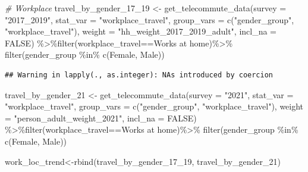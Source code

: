 \documentclass[
  12pt,
]{article}
\newenvironment{Shaded}{\begin{snugshade}}{\end{snugshade}}
\newcommand{\AttributeTok}[1]{\textcolor[rgb]{0.77,0.63,0.00}{#1}}
\newcommand{\CommentTok}[1]{\textcolor[rgb]{0.56,0.35,0.01}{\textit{#1}}}
\newcommand{\ConstantTok}[1]{\textcolor[rgb]{0.00,0.00,0.00}{#1}}
\newcommand{\FunctionTok}[1]{\textcolor[rgb]{0.00,0.00,0.00}{#1}}
\newcommand{\NormalTok}[1]{#1}
\newcommand{\OtherTok}[1]{\textcolor[rgb]{0.56,0.35,0.01}{#1}}
\newcommand{\SpecialCharTok}[1]{\textcolor[rgb]{0.00,0.00,0.00}{#1}}
\newcommand{\StringTok}[1]{\textcolor[rgb]{0.31,0.60,0.02}{#1}}
\begin{document}
\begin{Shaded}
\begin{Highlighting}[]
\CommentTok{\# Workplace}
\NormalTok{travel\_by\_gender\_17\_19 }\OtherTok{\textless{}{-}} \FunctionTok{get\_telecommute\_data}\NormalTok{(}\AttributeTok{survey =} \StringTok{"2017\_2019"}\NormalTok{,}
                                            \AttributeTok{stat\_var =} \StringTok{"workplace\_travel"}\NormalTok{,}
                                            \AttributeTok{group\_vars =} \FunctionTok{c}\NormalTok{(}\StringTok{"gender\_group"}\NormalTok{, }\StringTok{"workplace\_travel"}\NormalTok{),}
                                            \AttributeTok{weight =} \StringTok{"hh\_weight\_2017\_2019\_adult"}\NormalTok{,}
                                            \AttributeTok{incl\_na =} \ConstantTok{FALSE}\NormalTok{) }\SpecialCharTok{\%\textgreater{}\%}\FunctionTok{filter}\NormalTok{(workplace\_travel}\SpecialCharTok{==}\StringTok{\textquotesingle{}Works at home\textquotesingle{}}\NormalTok{)}\SpecialCharTok{\%\textgreater{}\%}
                                            \FunctionTok{filter}\NormalTok{(gender\_group }\SpecialCharTok{\%in\%} \FunctionTok{c}\NormalTok{(}\StringTok{\textquotesingle{}Female\textquotesingle{}}\NormalTok{, }\StringTok{\textquotesingle{}Male\textquotesingle{}}\NormalTok{))}
\end{Highlighting}
\end{Shaded}

\begin{verbatim}
## Warning in lapply(., as.integer): NAs introduced by coercion
\end{verbatim}

\begin{Shaded}
\begin{Highlighting}[]
\NormalTok{travel\_by\_gender\_21 }\OtherTok{\textless{}{-}} \FunctionTok{get\_telecommute\_data}\NormalTok{(}\AttributeTok{survey =} \StringTok{"2021"}\NormalTok{,}
                                            \AttributeTok{stat\_var =} \StringTok{"workplace\_travel"}\NormalTok{,}
                                            \AttributeTok{group\_vars =} \FunctionTok{c}\NormalTok{(}\StringTok{"gender\_group"}\NormalTok{, }\StringTok{"workplace\_travel"}\NormalTok{),}
                                            \AttributeTok{weight =} \StringTok{"person\_adult\_weight\_2021"}\NormalTok{,}
                                            \AttributeTok{incl\_na =} \ConstantTok{FALSE}\NormalTok{) }\SpecialCharTok{\%\textgreater{}\%}\FunctionTok{filter}\NormalTok{(workplace\_travel}\SpecialCharTok{==}\StringTok{\textquotesingle{}Works at home\textquotesingle{}}\NormalTok{)}\SpecialCharTok{\%\textgreater{}\%}
                                            \FunctionTok{filter}\NormalTok{(gender\_group }\SpecialCharTok{\%in\%} \FunctionTok{c}\NormalTok{(}\StringTok{\textquotesingle{}Female\textquotesingle{}}\NormalTok{, }\StringTok{\textquotesingle{}Male\textquotesingle{}}\NormalTok{))}

\NormalTok{work\_loc\_trend}\OtherTok{\textless{}{-}}\FunctionTok{rbind}\NormalTok{(travel\_by\_gender\_17\_19, travel\_by\_gender\_21)}
\end{Highlighting}
\end{Shaded}
\end{document}
